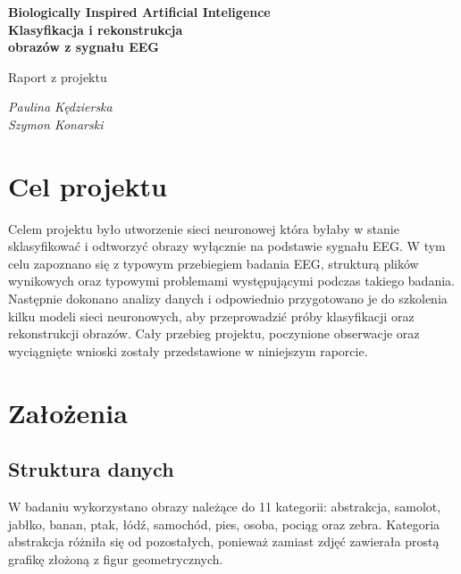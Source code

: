 \documentclass[12pt,a4paper,numbers=enddot,headings=small]{scrartcl} %
\begin{document}
	\begin{titlepage}
	
	\vspace*{3cm}
	
	\begin{center}
		{
			\bfseries
			\large Biologically Inspired Artificial Inteligence	\\		
			\bigskip \huge 
			Klasyfikacja i rekonstrukcja \\
			obrazów z sygnału EEG
			\bigskip
			
			\large
			Raport z projektu
		}
	\end{center}
	
	\vfill		%
	
	{\large
		\emph{Paulina Kędzierska}\\
		\emph{Szymon Konarski}
		
		
	}
	\end{titlepage}
	
	\newpage
	
	\section{Cel projektu}
	
	Celem projektu było utworzenie sieci neuronowej która byłaby w stanie sklasyfikować i odtworzyć obrazy wyłącznie na podstawie sygnału EEG. W tym celu zapoznano się z typowym przebiegiem badania EEG, strukturą plików wynikowych oraz typowymi problemami występującymi podczas takiego badania. Następnie dokonano analizy danych i odpowiednio przygotowano je do szkolenia kilku modeli sieci neuronowych, aby przeprowadzić próby klasyfikacji oraz rekonstrukcji obrazów. Cały przebieg projektu, poczynione obserwacje oraz wyciągnięte wnioski zostały przedstawione w niniejszym raporcie.
	
	\section{Założenia}
	
	\subsection{Struktura danych}
	
	W badaniu wykorzystano obrazy należące do 11 kategorii: abstrakcja, samolot, jabłko, banan, ptak, łódź, samochód, pies, osoba, pociąg oraz zebra. Kategoria abstrakcja różniła się od pozostałych, ponieważ zamiast zdjęć zawierała prostą grafikę złożoną z figur geometrycznych.
	
\end{document}
